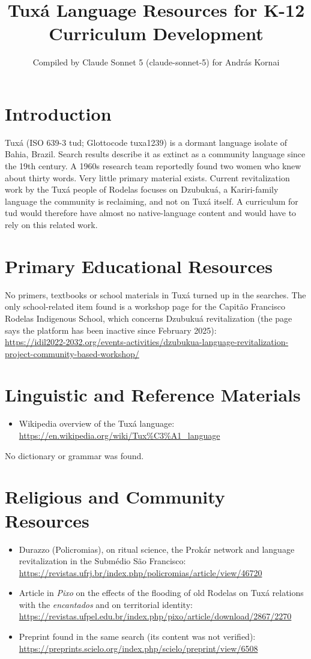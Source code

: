 \documentclass[12pt]{article}
\title{Tuxá Language Resources for K-12 Curriculum Development}
\author{Compiled by Claude Sonnet 5 (claude-sonnet-5) for Andr\'as Kornai}
\date{}
\begin{document}
\maketitle

\section{Introduction}
Tuxá (ISO 639-3 tud; Glottocode tuxa1239) is a dormant language isolate of Bahia, Brazil. Search results describe it as extinct as a community language since the 19th century. A 1960s research team reportedly found two women who knew about thirty words. Very little primary material exists. Current revitalization work by the Tuxá people of Rodelas focuses on Dzubukuá, a Kariri-family language the community is reclaiming, and not on Tuxá itself. A curriculum for tud would therefore have almost no native-language content and would have to rely on this related work.

\section{Primary Educational Resources}
No primers, textbooks or school materials in Tuxá turned up in the searches. The only school-related item found is a workshop page for the Capitão Francisco Rodelas Indigenous School, which concerns Dzubukuá revitalization (the page says the platform has been inactive since February 2025):\\
\url{https://idil2022-2032.org/events-activities/dzubukua-language-revitalization-project-community-based-workshop/}

\section{Linguistic and Reference Materials}
\begin{itemize}
\item Wikipedia overview of the Tuxá language: \url{https://en.wikipedia.org/wiki/Tux%C3%A1_language}
\end{itemize}
No dictionary or grammar was found.

\section{Religious and Community Resources}
\begin{itemize}
\item Durazzo (Policromias), on ritual science, the Prokár network and language revitalization in the Submédio São Francisco: \url{https://revistas.ufrj.br/index.php/policromias/article/view/46720}
\item Article in \textit{Pixo} on the effects of the flooding of old Rodelas on Tuxá relations with the \textit{encantados} and on territorial identity: \url{https://revistas.ufpel.edu.br/index.php/pixo/article/download/2867/2270}
\item Preprint found in the same search (its content was not verified): \url{https://preprints.scielo.org/index.php/scielo/preprint/view/6508}
\end{itemize}
\end{document}
